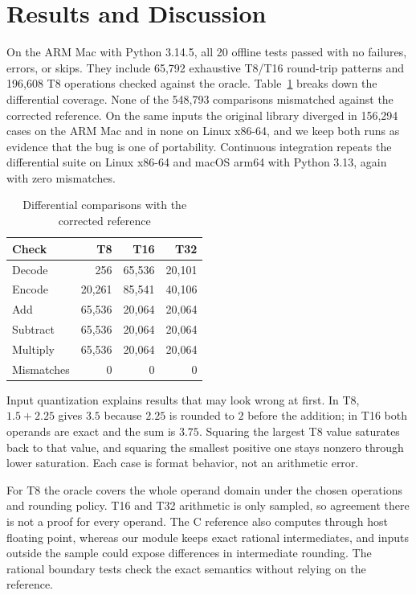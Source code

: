 \documentclass[conference]{IEEEtran}
\begin{document}
\section{Results and Discussion}
On the ARM Mac with Python 3.14.5, all 20 offline tests passed with no failures,
errors, or skips. They include 65,792 exhaustive T8/T16 round-trip patterns and
196,608 T8 operations checked against the oracle. Table~\ref{tab:validation}
breaks down the differential coverage. None of the 548,793 comparisons
mismatched against the corrected reference. On the same inputs the original
library diverged in 156,294 cases on the ARM Mac and in none on Linux x86-64,
and we keep both runs as evidence that the bug is one of portability. Continuous integration repeats the differential suite on Linux
x86-64 and macOS arm64 with Python 3.13, again with zero mismatches.

\begin{table}[t]
\caption{Differential comparisons with the corrected reference}
\label{tab:validation}
\centering
\begin{tabular}{lrrr}
\toprule
Check & T8 & T16 & T32\\
\midrule
Decode & 256 & 65,536 & 20,101\\
Encode & 20,261 & 85,541 & 40,106\\
Add & 65,536 & 20,064 & 20,064\\
Subtract & 65,536 & 20,064 & 20,064\\
Multiply & 65,536 & 20,064 & 20,064\\
\midrule
Mismatches & 0 & 0 & 0\\
\bottomrule
\end{tabular}
\end{table}

Input quantization explains results that may look wrong at first. In T8,
$1.5+2.25$ gives $3.5$ because $2.25$ is rounded to $2$ before the addition; in
T16 both operands are exact and the sum is $3.75$. Squaring the largest T8 value
saturates back to that value, and squaring the smallest positive one stays
nonzero through lower saturation. Each case is format behavior, not an
arithmetic error.

For T8 the oracle covers the whole operand domain under the chosen operations
and rounding policy. T16 and T32 arithmetic is only sampled, so agreement there
is not a proof for every operand. The C reference also computes through host
floating point, whereas our module keeps exact rational intermediates, and
inputs outside the sample could expose differences in intermediate rounding.
The rational boundary tests check the exact semantics without relying on the
reference.
\end{document}
